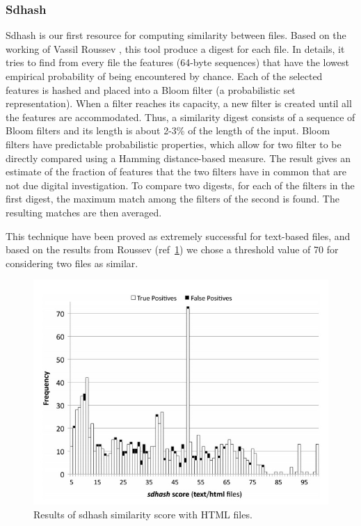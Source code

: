 \subsubsection{Sdhash}
Sdhash is our first resource for computing similarity between files. Based on the working of Vassil Roussev \cite{sdhash}, this tool produce a digest for each file. In details, it tries to find from every file the features (64-byte sequences) that have the lowest empirical probability of being encountered by chance. Each of the selected features is hashed and placed into a Bloom filter (a probabilistic set representation). When a filter reaches its capacity, a new filter is created until all the features are accommodated. Thus, a similarity digest consists of a sequence of Bloom filters and its length is about 2-3\% of the length of the input. Bloom filters have predictable probabilistic properties, which allow for two filter to be directly compared using a Hamming distance-based measure. The result gives an estimate of the fraction of features that the two filters have in common that are not due digital investigation.
To compare two digests, for each of the filters in the first digest, the maximum match among the filters of the second is found. The resulting matches are then averaged.

This technique have been proved as extremely successful for text-based files, and based on the results from Roussev (ref~\ref{fig:sdhash_tp_fp}) we chose a threshold value of 70 for considering two files as similar.

\begin{figure}[tbh]
\centerline{\includegraphics[scale=1]{Images/sdhash_TP_FP.jpg}}
\caption{Results of sdhash similarity score with HTML files.\label{fig:sdhash_tp_fp}}
\end{figure}


